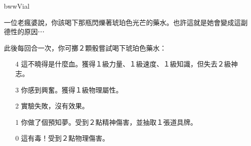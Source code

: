 \begin{OmenCard}{bww}{Vial}{}
  \begin{CardStory}
    一位老瘋婆說，你該喝下那瓶閃爍著琥珀色光芒的藥水。也許這就是她會變成這副德性的原因⋯
  \end{CardStory}
  此後每回合一次，你可擲２顆骰嘗試喝下琥珀色藥水：
  \begin{itemize}
    \item[4] 這不曉得是什麼血。獲得１級力量、１級速度、１級知識，但失去２級神志。
    \item[3] 你感到興奮。獲得１級物理屬性。
    \item[2] 實驗失敗，沒有效果。
    \item[1] 你做了個預知夢。受到２點精神傷害，並抽取１張道具牌。
    \item[0] 這有毒！受到２點物理傷害。
  \end{itemize}
\end{OmenCard}%
\linebreak[0]%
